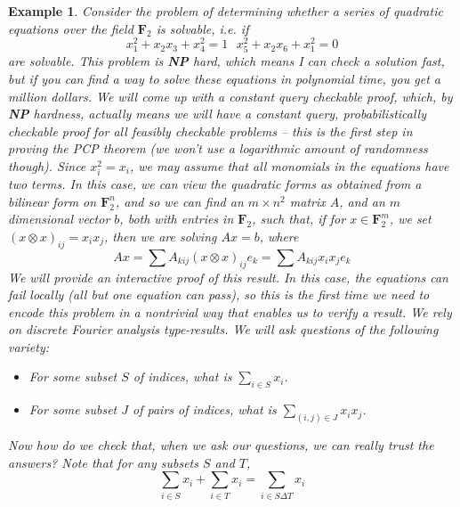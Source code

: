 \documentclass{article}
\theoremstyle{plain}
\newtheorem*{example}{Example}
\theoremstyle{definition}
\begin{document}
\begin{example}
    Consider the problem of determining whether a series of quadratic equations over the field $\mathbf{F}_2$ is solvable, i.e. if
    \[ x_1^2 + x_2x_3 + x_4^2 = 1\ \ \ x_5^2 + x_2x_6 + x_1^2 = 0 \]
    are solvable. This problem is {\bf NP} hard, which means I can check a solution fast, but if you can find a way to solve these equations in polynomial time, you get a million dollars. We will come up with a constant query checkable proof, which, by {\bf NP} hardness, actually means we will have a constant query, probabilistically checkable proof for {\it all} feasibly checkable problems -- this is the first step in proving the PCP theorem (we won't use a logarithmic amount of randomness though). Since $x_i^2 = x_i$, we may assume that all monomials in the equations have two terms. In this case, we can view the quadratic forms as obtained from a bilinear form on $\mathbf{F}_2^n$, and so we can find an $m \times n^2$ matrix $A$, and an $m$ dimensional vector $b$, both with entries in $\mathbf{F}_2$, such that, if for $x \in \mathbf{F}_2^m$, we set $(x \otimes x)_{ij} = x_i x_j$, then we are solving $Ax = b$, where
    \[ Ax = \sum A_{kij} (x \otimes x)_{ij} e_k = \sum A_{kij} x_i x_j e_k \]
    We will provide an interactive proof of this result. In this case, the equations can fail locally (all but one equation can pass), so this is the first time we need to encode this problem in a nontrivial way that enables us to verify a result. We rely on discrete Fourier analysis type-results. We will ask questions of the following variety:
    \begin{itemize}
        \item For some subset $S$ of indices, what is $\sum_{i \in S} x_i$.
        \item For some subset $J$ of pairs of indices, what is $\sum_{(i,j) \in J} x_ix_j$.
    \end{itemize}
    Now how do we check that, when we ask our questions, we can really trust the answers? Note that for any subsets $S$ and $T$,
    \[ \sum_{i \in S} x_i + \sum_{i \in T} x_i = \sum_{i \in S \Delta T} x_i \]

\end{example}
\end{document}
